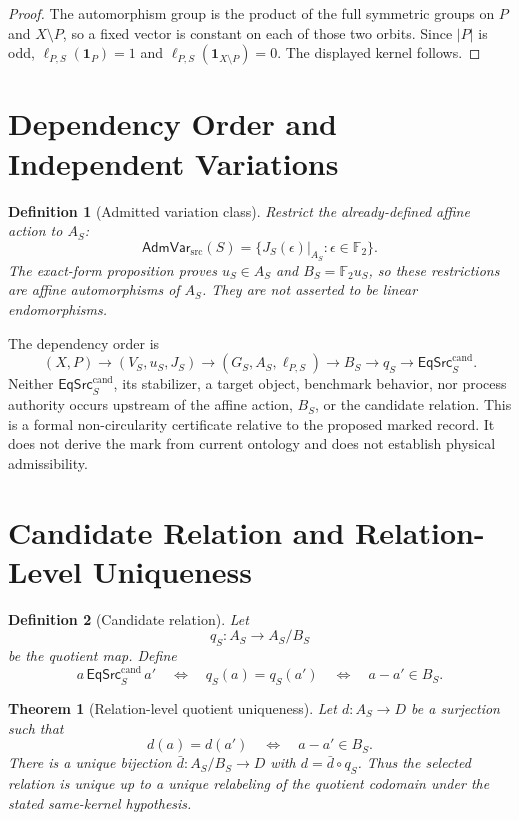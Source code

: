 \documentclass[11pt]{article}
\newtheorem{definition}{Definition}
\newtheorem{theorem}{Theorem}
\newcommand{\Ftwo}{\mathbb F_2}
\newcommand{\AdmVar}{\mathsf{AdmVar}_{\mathrm{src}}}
\newcommand{\EqCand}{\mathsf{EqSrc}^{\mathrm{cand}}}
\begin{document}
\begin{proof}
The automorphism group is the product of the full symmetric groups on \(P\)
and \(X\setminus P\), so a fixed vector is constant on each of those two
orbits. Since \(|P|\) is odd,
\(\ell_{P,S}(\mathbf1_P)=1\) and
\(\ell_{P,S}(\mathbf1_{X\setminus P})=0\). The displayed kernel follows.
\end{proof}

\section{Dependency Order and Independent Variations}

\begin{definition}[Admitted variation class]
Restrict the already-defined affine action to \(A_S\):
\[
 \AdmVar(S)=\{J_S(\epsilon)|_{A_S}:\epsilon\in\Ftwo\}.
\]
The exact-form proposition proves \(u_S\in A_S\) and
\(B_S=\Ftwo u_S\), so these restrictions are affine automorphisms of
\(A_S\). They are not asserted to be linear endomorphisms.
\end{definition}

The dependency order is
\[
 (X,P)\longrightarrow(V_S,u_S,J_S)
 \longrightarrow(G_S,A_S,\ell_{P,S})\longrightarrow B_S
 \longrightarrow q_S\longrightarrow\EqCand_S.
\]
Neither \(\EqCand_S\), its stabilizer, a target object, benchmark behavior,
nor process authority occurs upstream of the affine action, \(B_S\), or the
candidate relation. This is a formal non-circularity certificate relative to
the proposed marked record.
It does not derive the mark from current ontology and does not establish
physical admissibility.

\section{Candidate Relation and Relation-Level Uniqueness}

\begin{definition}[Candidate relation]
Let
\[
 q_S:A_S\longrightarrow A_S/B_S
\]
be the quotient map. Define
\[
 a\,\EqCand_S\,a'
 \quad\Longleftrightarrow\quad
 q_S(a)=q_S(a')
 \quad\Longleftrightarrow\quad a-a'\in B_S.
\]
\end{definition}

\begin{theorem}[Relation-level quotient uniqueness]
Let \(d:A_S\to D\) be a surjection such that
\[
 d(a)=d(a')\quad\Longleftrightarrow\quad a-a'\in B_S.
\]
There is a unique bijection \(\bar d:A_S/B_S\to D\) with
\(d=\bar d\circ q_S\). Thus the selected relation is unique up to a unique
relabeling of the quotient codomain under the stated same-kernel hypothesis.
\end{theorem}
\end{document}
